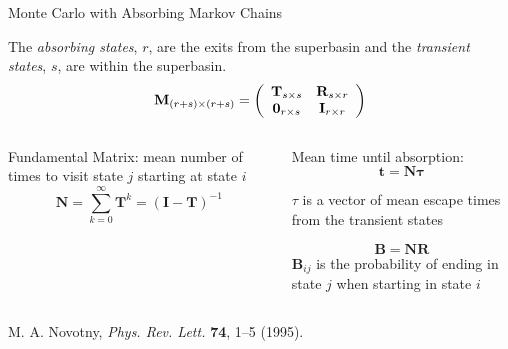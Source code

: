 \documentclass[onlymath]{beamer}
\begin{document}
\begin{frame}{Monte Carlo with Absorbing Markov Chains}

  The \emph{absorbing
  states}, $r$, are the exits from the superbasin and the \emph{transient
  states}, $s$, are within the superbasin. 
  \begin{equation*}
    \mathbf{M}_{(r+s) \times (r+s)} = 
    \left(
      \begin{array}{ c c }
        \mathbf{T}_{s\times s} & \mathbf{R}_{s\times r} \\
        \mathbf{0}_{r\times s} & \mathbf{I}_{r\times r} 
      \end{array}
    \right)
  \end{equation*}

  \vspace{3 mm}

  \begin{columns}[t]
    \begin{column}[l]{0.5\textwidth}
      Fundamental Matrix: mean number of times to visit state $j$ starting at state $i$
                  \vspace{-2mm}
      \begin{equation*}
        \mathbf{N}=\sum_{k=0}^\infty \mathbf{T}^k= {(\mathbf{I}-\mathbf{T})}^{-1} 
      \end{equation*}

    \end{column}

    \begin{column}[r]{0.5\textwidth}
          Mean time until absorption:
            \vspace{-2mm}
      \begin{equation*}
        \mathbf{t} = \mathbf{N} \mathbf{\tau} 
      \end{equation*}

      {$\tau$ is a vector of mean escape times from the transient states}
      
      
      \begin{equation*}
        \mathbf{B}=\mathbf{N} \mathbf{R} 
      \end{equation*}
      $\mathbf{B}_{ij}$ is the probability of ending in state $j$ when starting in state $i$ 
    \end{column}
  \end{columns}
  
  {\tiny  M. A. Novotny, \textit{Phys. Rev. Lett.} \textbf{74}, 1--5 (1995).}

\end{frame}
\end{document}
